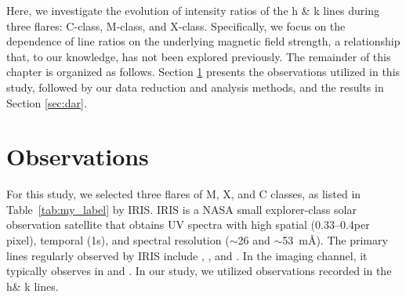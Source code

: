Here, we investigate the evolution of intensity ratios of the   h \& k lines during three flares: C-class, M-class, and X-class. Specifically, we focus on the dependence of line ratios on the underlying magnetic field strength, a relationship that, to our knowledge, has not been explored previously. The remainder of this chapter is organized as follows. Section \ref{sec:obs} presents the observations utilized in this study, followed by our data reduction and analysis methods, and the results in Section \ref{sec:dar}.

\section{Observations} \label{sec:obs}
\begin{table}[ht!]
\centering
{}
\caption{List of flares studied in this chapter.}
\label{tab:my_label}
\end{table}

For this study, we selected three flares of M, X, and C classes, as listed in Table~\ref{tab:my_label} by IRIS. IRIS is a NASA small explorer-class solar observation satellite that obtains UV spectra with high spatial (0.33{--}0.4\arcsec per pixel), temporal (1s), and spectral resolution ($\sim$26 and $\sim$53~m{\AA}). The primary lines regularly observed by IRIS include ,  , and . In the imaging channel, it typically observes in   and . In our study, we utilized observations recorded in the   h\& k lines.

